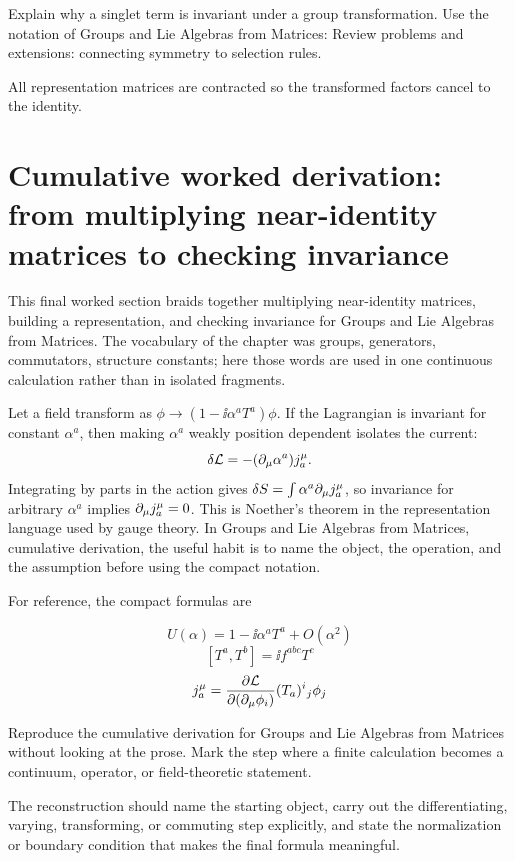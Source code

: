 \begin{exercise}
Explain why a singlet term is invariant under a group transformation.  Use the notation of Groups and Lie Algebras from Matrices: Review problems and extensions: connecting symmetry to selection rules.
\begin{answer}
All representation matrices are contracted so the transformed factors cancel to the identity.
\end{answer}
\end{exercise}



\section{Cumulative worked derivation: from multiplying near-identity matrices to checking invariance}

This final worked section braids together multiplying near-identity matrices, building a representation, and checking invariance for Groups and Lie Algebras from Matrices.  The vocabulary of the chapter was groups, generators, commutators, structure constants; here those words are used in one continuous calculation rather than in isolated fragments.

Let a field transform as \(\phi\to (1-\ii\alpha^aT^a)\phi\).  If the Lagrangian is invariant for constant \(\alpha^a\), then making \(\alpha^a\) weakly position dependent isolates the current:
\[
  \delta\mathcal L=-(\partial_\mu\alpha^a)j^\mu_a.
\]
Integrating by parts in the action gives \(\delta S=\int\alpha^a\partial_\mu j^\mu_a\), so invariance for arbitrary \(\alpha^a\) implies \(\partial_\mu j^\mu_a=0\).  This is Noether's theorem in the representation language used by gauge theory.  In Groups and Lie Algebras from Matrices, cumulative derivation, the useful habit is to name the object, the operation, and the assumption before using the compact notation.

For reference, the compact formulas are

\[
  U(\alpha)=1-\ii\alpha^aT^a+O(\alpha^2)
\]
\[
  [T^a,T^b]=\ii f^{abc}T^c
\]
\[
  j^\mu_a=\frac{\partial\mathcal L}{\partial(\partial_\mu\phi_i)}(T_a)^i{}_j\phi_j
\]

\begin{exercise}
Reproduce the cumulative derivation for Groups and Lie Algebras from Matrices without looking at the prose.  Mark the step where a finite calculation becomes a continuum, operator, or field-theoretic statement.
\begin{answer}
The reconstruction should name the starting object, carry out the differentiating, varying, transforming, or commuting step explicitly, and state the normalization or boundary condition that makes the final formula meaningful.
\end{answer}
\end{exercise}



